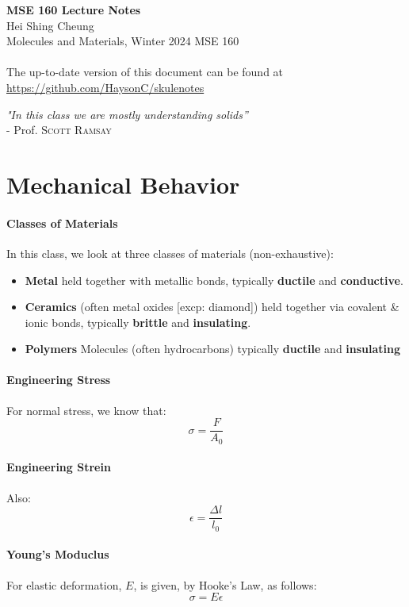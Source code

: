 \documentclass[11pt]{report}
\begin{document}
\thispagestyle{empty}
{\LARGE \bf MSE 160 Lecture Notes}\\
{\large Hei Shing Cheung}\\
Molecules and Materials, Winter 2024 \hfill MSE 160\\
\\
The up-to-date version of this document can be found at \url{https://github.com/HaysonC/skulenotes}\\
\begin{center}
\textit{"In this class we are mostly understanding solids''} \\ - Prof. \textsc{Scott Ramsay}
\end{center}
\vspace{10pt}
\section{Mechanical Behavior}
\paragraph{Classes of Materials} In this class, we look at three classes of materials (non-exhaustive):
\begin{itemize}
    \item \textbf{Metal} held together with metallic bonds, typically \textbf{ductile} and \textbf{conductive}.
    \item \textbf{Ceramics}  (often metal oxides [excp: diamond]) held together via covalent \& ionic bonds, typically \textbf{brittle} and \textbf{insulating}.
    \item \textbf{Polymers} Molecules (often hydrocarbons) typically \textbf{ductile} and \textbf{insulating}
\end{itemize}
\paragraph{Engineering Stress} For normal stress, we know that:
\begin{equation}
    \sigma = \frac{F}{A_0}
\end{equation}
\paragraph{Engineering Strein} Also:
\begin{equation}
    \epsilon = \frac{\Delta l}{l_0}
\end{equation}
\paragraph{Young's Moduclus} For elastic deformation, $E$, is given, by Hooke's Law, as follows:
\begin{equation}
    \sigma = E \epsilon
\end{equation}
\end{document}
